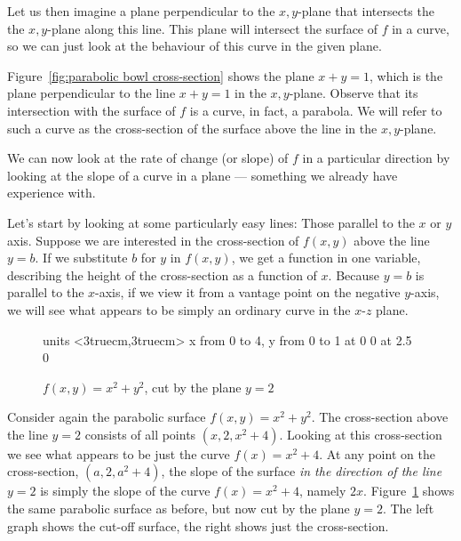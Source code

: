 Let us then imagine a plane perpendicular to the $x,y$-plane that intersects
the the $x,y$-plane along this line. This plane will intersect the surface of
$f$ in a curve, so we can just look at the behaviour of this curve in the given plane.

Figure~\ref{fig:parabolic bowl cross-section} shows the plane $x+y=1$, which
is the plane perpendicular to the line $x+y=1$ in the $x,y$-plane.
Observe that its intersection with the surface of $f$ is a curve, in fact, a parabola.
We will refer to such a curve as the cross-section of the surface above the line in
the $x,y$-plane.

We can now look at the rate of change (or slope) of $f$ in a particular
direction by looking at the slope of a curve in a plane --- something we
already have experience with.

Let's start by looking at some particularly
easy lines: Those parallel to the $x$ or $y$ axis. Suppose we are
interested in the cross-section of $f(x,y)$ above the line $y=b$. If
we substitute $b$ for $y$ in $f(x,y)$, we get a function in one
variable, describing the height of the cross-section as a function of
$x$. Because $y=b$ is parallel to the $x$-axis, if we view it from a
vantage point on the negative $y$-axis, we will see what appears to be
simply an ordinary curve in the $x$-$z$ plane.

\begin{figure}[H]
\centerline{
\vbox{\beginpicture
\normalgraphs
\setcoordinatesystem units <3truecm,3truecm>
\setplotarea x from 0 to 4, y from 0 to 1
 at 0 0
 at 2.5 0
\endpicture}}
\caption{$f(x,y)=x^2 + y^2$, cut by the plane $y=2$}
\label{fig:parabolic bowl cross-section two}
\end{figure}

Consider again the parabolic surface $f(x,y)=x^2+y^2$. The
cross-section above the line $y=2$ consists of all points
$(x,2,x^2+4)$. Looking at this cross-section we see what appears to be just the curve
$f(x)=x^2+4$. At any point on the cross-section, $(a,2,a^2+4)$, the
slope of the surface \emph{in the direction of the line} $y=2$ is
  simply the slope of the curve $f(x)=x^2+4$, namely $2x$.
Figure~\ref{fig:parabolic bowl cross-section two} shows the same
parabolic surface as before, but now cut by the plane $y=2$. The left
graph shows the cut-off surface, the right shows just the
cross-section. 


